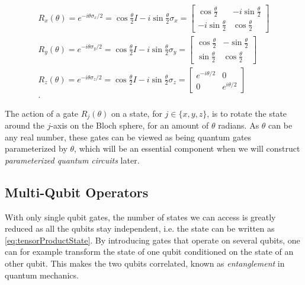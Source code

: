 \begin{equation}\label{eq:PauliRotations}
\begin{aligned}
    R_x(\theta) = e^{-i\theta\sigma_x/2} = \cos{\frac{\theta}{2}}I - i\sin{\frac{\theta}{2}}\sigma_x
    =
    \begin{bmatrix}
        \cos{\frac{\theta}{2}} & -i\sin{\frac{\theta}{2}} \\
        -i\sin{\frac{\theta}{2}} & \cos{\frac{\theta}{2}}
    \end{bmatrix}\\
    R_y(\theta) = e^{-i\theta\sigma_y/2} = \cos{\frac{\theta}{2}}I - i\sin{\frac{\theta}{2}}\sigma_y
    =
    \begin{bmatrix}
        \cos{\frac{\theta}{2}} & -\sin{\frac{\theta}{2}} \\
        \sin{\frac{\theta}{2}} & \cos{\frac{\theta}{2}}
    \end{bmatrix}\\
    R_z(\theta) = e^{-i\theta\sigma_z/2} = \cos{\frac{\theta}{2}}I - i\sin{\frac{\theta}{2}}\sigma_z
    =
    \begin{bmatrix}
        e^{-i\theta/2} & 0 \\
        0 & e^{i\theta/2}
    \end{bmatrix}\\.
\end{aligned}    
\end{equation}

The action of a gate $R_j(\theta)$ on a state, for $j \in \{x,y,z\}$, is to rotate the state around the $j$-axis on the Bloch sphere, for an amount of $\theta$ radians. As $\theta$ can be any real number, these gates can be viewed as being quantum gates parameterized by $\theta$, which will be an essential component when we will construct \emph{parameterized quantum circuits} later.

\subsection{Multi-Qubit Operators}\label{sec:ControlledOperations}
With only single qubit gates, the number of states we can access is greatly reduced as all the qubits stay independent, i.e. the state can be written as \cref{eq:tensorProductState}. By introducing gates that operate on several qubits, one can for example transform the state of one qubit conditioned on the state of an other qubit. This makes the two qubits correlated, known as \emph{entanglement} in quantum mechanics.


